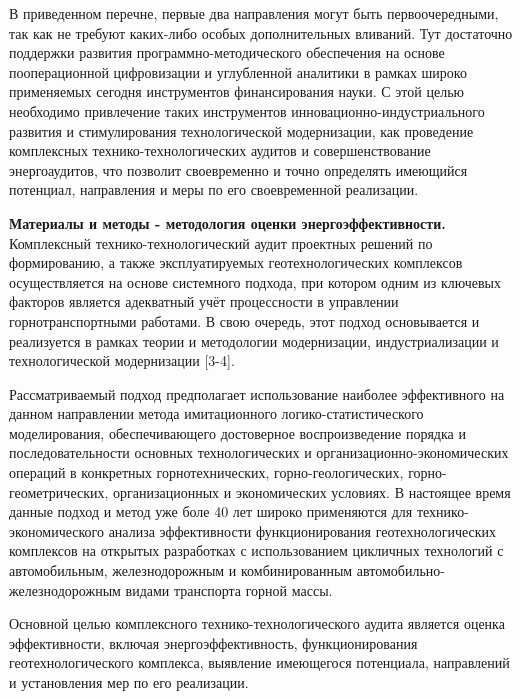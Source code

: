 \begin{multicols}{2}
В приведенном перечне, первые два направления могут быть
первоочередными, так как не требуют каких-либо особых дополнительных
вливаний. Тут достаточно поддержки развития программно-методического
обеспечения на основе пооперационной цифровизации и углубленной
аналитики в рамках широко применяемых сегодня инструментов
финансирования науки. С этой целью необходимо привлечение таких
инструментов инновационно-индустриального развития и стимулирования
технологической модернизации, как проведение комплексных
технико-технологических аудитов и совершенствование энергоаудитов, что
позволит своевременно и точно определять имеющийся потенциал,
направления и меры по его своевременной реализации.

{\bfseries Материалы и методы - методология оценки энергоэффективности.}
Комплексный технико-технологический аудит проектных решений по
формированию, а также эксплуатируемых геотехнологических комплексов
осуществляется на основе системного подхода, при котором одним из
ключевых факторов является адекватный учёт процессности в управлении
горнотранспортными работами. В свою очередь, этот подход основывается и
реализуется в рамках теории и методологии модернизации, индустриализации
и технологической модернизации {[}3-4{]}.

Рассматриваемый подход предполагает использование наиболее эффективного
на данном направлении метода имитационного логико-статистического
моделирования, обеспечивающего достоверное воспроизведение порядка и
последовательности основных технологических и
организационно-экономических операций в конкретных горнотехнических,
горно-геологических, горно-геометрических, организационных и
экономических условиях. В настоящее время данные подход и метод уже боле
40 лет широко применяются для технико-экономического анализа
эффективности функционирования геотехнологических комплексов на открытых
разработках с использованием цикличных технологий с автомобильным,
железнодорожным и комбинированным автомобильно-железнодорожным видами
транспорта горной массы.

Основной целью комплексного технико-технологического аудита является
оценка эффективности, включая энергоэффективность, функционирования
геотехнологического комплекса, выявление имеющегося потенциала,
направлений и установления мер по его реализации.


\end{multicols}
